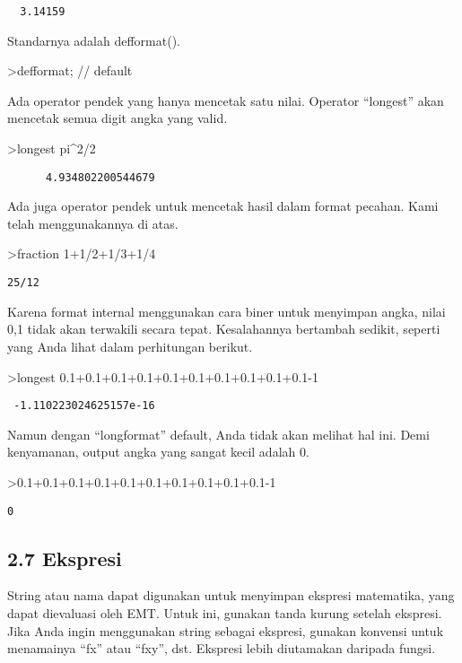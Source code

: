 \documentclass[
]{book}
\begin{document}
\begin{verbatim}
  3.14159 
\end{verbatim}

Standarnya adalah defformat().

\textgreater defformat; // default

Ada operator pendek yang hanya mencetak satu nilai. Operator ``longest'' akan mencetak semua digit angka yang valid.

\textgreater longest pi\^{}2/2

\begin{verbatim}
      4.934802200544679 
\end{verbatim}

Ada juga operator pendek untuk mencetak hasil dalam format pecahan. Kami telah menggunakannya di atas.

\textgreater fraction 1+1/2+1/3+1/4

\begin{verbatim}
25/12
\end{verbatim}

Karena format internal menggunakan cara biner untuk menyimpan angka, nilai 0,1 tidak akan terwakili secara tepat. Kesalahannya bertambah sedikit, seperti yang Anda lihat dalam perhitungan berikut.

\textgreater longest 0.1+0.1+0.1+0.1+0.1+0.1+0.1+0.1+0.1+0.1-1

\begin{verbatim}
 -1.110223024625157e-16 
\end{verbatim}

Namun dengan ``longformat'' default, Anda tidak akan melihat hal ini. Demi kenyamanan, output angka yang sangat kecil adalah 0.

\textgreater0.1+0.1+0.1+0.1+0.1+0.1+0.1+0.1+0.1+0.1-1

\begin{verbatim}
0
\end{verbatim}

\subsection{2.7 Ekspresi}\label{ekspresi}

String atau nama dapat digunakan untuk menyimpan ekspresi matematika, yang dapat dievaluasi oleh EMT. Untuk ini, gunakan tanda kurung setelah ekspresi. Jika Anda ingin menggunakan string sebagai ekspresi, gunakan konvensi untuk menamainya ``fx'' atau ``fxy'', dst. Ekspresi lebih diutamakan daripada fungsi.
\end{document}
